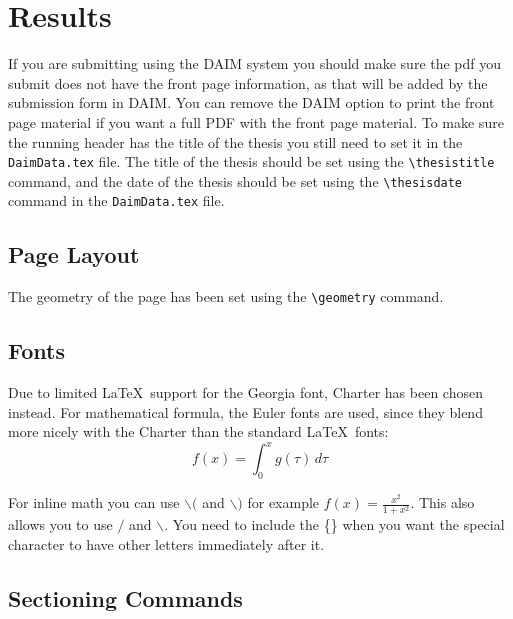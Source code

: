 \chapter{Results}
\label{chap:results}

If you are submitting using the DAIM system you should make sure the pdf you submit does not have the front page information, as that will be added by the submission form in DAIM.  You can remove the DAIM option to print the front page material if you want a full PDF with the front page material. To make sure the running header has the title of the thesis you still need to set it in the \verb+DaimData.tex+ file. The title of the thesis should be set using the \verb+\thesistitle+
command, and the date of the thesis should be set using the
\verb+\thesisdate+ command in the \verb+DaimData.tex+ file. 

\section{Page Layout}

The geometry of the page has been set using the \verb+\geometry+
command.

\section{Fonts}

Due to limited \LaTeX\ support for the Georgia font, Charter has been
chosen instead. For mathematical formula, the Euler fonts are used,
since they blend more nicely with the Charter than the standard
\LaTeX\ fonts: 
\begin{equation} \label{eq:1}
    f(x) = \int_0^x g(\tau)\,d\tau
\end{equation}



For inline math you can use $\backslash{}($ and $\backslash{})$ for example \( f(x)= \frac{x^2}{1+x^2} \).  
This also allows you to use $\slash$ and $\backslash$. You need to include the \{\} when you want the special
character to have other letters immediately after it.

\section{Sectioning Commands}

